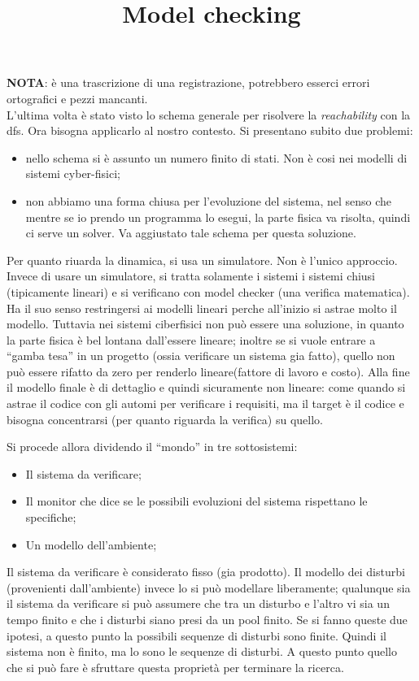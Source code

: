 \documentclass[a4paper, 11pt]{article}
\title{Model checking}
\begin{document}
\maketitle

\textbf{NOTA}: è una trascrizione di una registrazione, potrebbero esserci errori ortografici e pezzi mancanti. \\

 L'ultima volta è stato visto lo schema generale per risolvere la \emph{reachability} con la dfs. Ora bisogna applicarlo al nostro contesto. Si presentano subito due problemi:
 \begin{itemize}
  \item nello schema si è assunto un numero finito di stati. Non è cosi nei modelli di sistemi cyber-fisici;
  \item non abbiamo una forma chiusa per l'evoluzione del sistema, nel senso che mentre se io prendo un programma lo esegui, la parte fisica va risolta, quindi ci serve un solver. Va aggiustato tale schema per questa soluzione.
 \end{itemize}
 
 Per quanto riuarda la dinamica, si usa un simulatore. Non è l'unico approccio. Invece di usare un simulatore, si tratta solamente i sistemi i sistemi chiusi (tipicamente lineari) e si verificano con model checker (una verifica matematica). Ha il suo senso restringersi ai modelli lineari perche all'inizio si astrae molto il modello. Tuttavia nei sistemi ciberfisici non può essere una soluzione, in quanto la parte fisica è bel lontana dall'essere lineare; inoltre se si vuole entrare a ``gamba tesa'' in un progetto (ossia verificare un sistema gia fatto), quello non può essere rifatto da zero per renderlo lineare(fattore di lavoro e costo). Alla fine il modello finale è di dettaglio e quindi sicuramente non lineare: come quando si astrae il codice con gli automi per verificare i requisiti, ma il target è il codice e bisogna concentrarsi (per quanto riguarda la verifica) su quello.
 
 Si procede allora dividendo il ``mondo'' in tre sottosistemi:
 \begin{itemize}
  \item Il sistema da verificare;
  \item Il monitor che dice se le possibili evoluzioni del sistema rispettano le specifiche;
  \item Un modello dell'ambiente;
 \end{itemize}
 
 Il sistema da verificare è considerato fisso (gia prodotto). Il modello dei disturbi (provenienti dall'ambiente) invece lo si può modellare liberamente; qualunque sia il sistema da verificare si può assumere che tra un disturbo e l'altro vi sia un tempo finito e che i disturbi siano presi da un pool finito. Se si fanno queste due ipotesi, a questo punto la possibili sequenze di disturbi sono finite. Quindi il sistema non è finito, ma lo sono le sequenze di disturbi. A questo punto quello che si può fare è sfruttare questa proprietà per terminare la ricerca.\\
\end{document}
